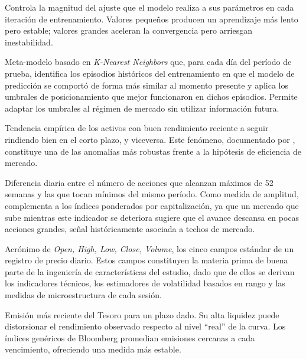 \begin{description}[style=nextline, leftmargin=1.5cm]
\item[\hypertarget{glos:learning_rate}{Tasa de aprendizaje (\textit{learning rate})}]
Controla la magnitud del ajuste que el modelo realiza a sus par\'ametros en cada iteraci\'on de entrenamiento. Valores peque\~nos producen un aprendizaje m\'as lento pero estable; valores grandes aceleran la convergencia pero arriesgan inestabilidad.

\item[\hypertarget{glos:meta_knn}{Meta-KNN}]
Meta-modelo basado en \textit{K-Nearest Neighbors} que, para cada d\'ia del per\'iodo de prueba, identifica los episodios hist\'oricos del entrenamiento en que el modelo de predicci\'on se comport\'o de forma m\'as similar al momento presente y aplica los umbrales de posicionamiento que mejor funcionaron en dichos episodios. Permite adaptar los umbrales al r\'egimen de mercado sin utilizar informaci\'on futura.

\item[\hypertarget{glos:momentum}{\textit{Momentum}}]
Tendencia emp\'irica de los activos con buen rendimiento reciente a seguir rindiendo bien en el corto plazo, y viceversa. Este fen\'omeno, documentado por \citet{jegadeesh1993}, constituye una de las anomal\'ias m\'as robustas frente a la hip\'otesis de eficiencia de mercado.

\item[\hypertarget{glos:new_highs_lows}{\textit{New Highs--New Lows}}]
Diferencia diaria entre el n\'umero de acciones que alcanzan m\'aximos de 52 semanas y las que tocan m\'inimos del mismo per\'iodo. Como medida de amplitud, complementa a los \'indices ponderados por capitalizaci\'on, ya que un mercado que sube mientras este indicador se deteriora sugiere que el avance descansa en pocas acciones grandes, se\~nal hist\'oricamente asociada a techos de mercado.

\item[\hypertarget{glos:ohlcv}{OHLCV}]
Acr\'onimo de \textit{Open, High, Low, Close, Volume}, los cinco campos est\'andar de un registro de precio diario. Estos campos constituyen la materia prima de buena parte de la ingenier\'ia de caracter\'isticas del estudio, dado que de ellos se derivan los indicadores t\'ecnicos, los estimadores de volatilidad basados en rango y las medidas de microestructura de cada sesi\'on.

\item[\hypertarget{glos:on_the_run}{\textit{On-the-run} (bonos)}]
Emisi\'on m\'as reciente del Tesoro para un plazo dado. Su alta liquidez puede distorsionar el rendimiento observado respecto al nivel ``real'' de la curva. Los \'indices gen\'ericos de Bloomberg promedian emisiones cercanas a cada vencimiento, ofreciendo una medida m\'as estable.


\end{description}
